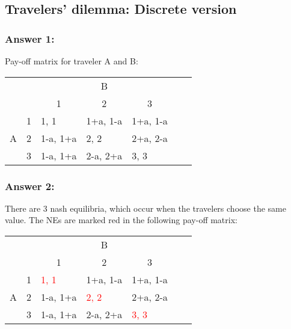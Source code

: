 \documentclass[11pt]{article}
\begin{document}
    \subsection{Travelers’ dilemma: Discrete version}

    \subsubsection{Answer 1:}
    Pay-off matrix for traveler A and B:
    \begin{table}[h]
        \centering
        \begin{tabular}{lllllll}
            & & \multicolumn{3}{c}{B} & & \\
            &                        & \multicolumn{1}{c}{1}         & \multicolumn{1}{c}{2}         & \multicolumn{1}{c}{3}         & & \\ \cline{3-5}
            \multirow{3}{*}{A} & \multicolumn{1}{r|}{1} & \multicolumn{1}{l|}{1, 1}     & \multicolumn{1}{l|}{1+a, 1-a} & \multicolumn{1}{l|}{1+a, 1-a} &  &  \\ \cline{3-5}
            & \multicolumn{1}{l|}{2} & \multicolumn{1}{l|}{1-a, 1+a} & \multicolumn{1}{l|}{2, 2}     & \multicolumn{1}{l|}{2+a, 2-a} & & \\ \cline{3-5}
            & \multicolumn{1}{l|}{3} & \multicolumn{1}{l|}{1-a, 1+a} & \multicolumn{1}{l|}{2-a, 2+a} & \multicolumn{1}{l|}{3, 3} & & \\ \cline{3-5}
        \end{tabular}
    \end{table}

    \subsubsection{Answer 2:}
    There are 3 nash equilibria, which occur when the travelers choose the same value. The NEs are marked red in the following pay-off matrix:

    \begin{table}[h]
        \centering
        \begin{tabular}{lllllll}
            & & \multicolumn{3}{c}{B} & & \\
            &                        & \multicolumn{1}{c}{1}                      & \multicolumn{1}{c}{2}                      & \multicolumn{1}{c}{3}                      & & \\ \cline{3-5}
            \multirow{3}{*}{A} & \multicolumn{1}{r|}{1} & \multicolumn{1}{l|}{\textcolor{red}{1, 1}} & \multicolumn{1}{l|}{1+a, 1-a} & \multicolumn{1}{l|}{1+a, 1-a} &  &  \\ \cline{3-5}
            & \multicolumn{1}{l|}{2} & \multicolumn{1}{l|}{1-a, 1+a}              & \multicolumn{1}{l|}{\textcolor{red}{2, 2}} & \multicolumn{1}{l|}{2+a, 2-a} & & \\ \cline{3-5}
            & \multicolumn{1}{l|}{3} & \multicolumn{1}{l|}{1-a, 1+a}              & \multicolumn{1}{l|}{2-a, 2+a} & \multicolumn{1}{l|}{\textcolor{red}{3, 3}} & & \\ \cline{3-5}
        \end{tabular}
    \end{table}
\end{document}

